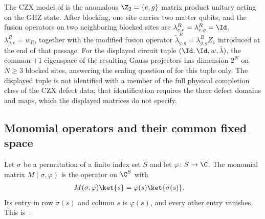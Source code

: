 The CZX model of \cite[lines~4503--5183]{FrancoRubio2025MPUGauging} is the
anomalous $\Z_2=\{e,g\}$ matrix product unitary acting on the GHZ state.
After blocking, one site carries two matter qubits, and the fusion operators on
two neighboring blocked sites are $\lambda^R_{e,e}=\lambda^R_{e,g}=\Id$,
$\lambda^R_{g,e}=w_R$, together with the modified fusion operator
$\tilde\lambda^R_{g,g}=\lambda^R_{g,g}Z_1$ introduced at the end of that
passage.
For the displayed circuit tuple $(\Id,\Id,w,\tilde\lambda)$, the common $+1$
eigenspace of the resulting Gauss projectors has dimension $2^N$ on
$N\geq3$ blocked sites, answering the scaling question of
\cite[lines~5198--5204]{FrancoRubio2025MPUGauging} for this tuple only. The
displayed tuple is not identified with a member of the full physical
completion class of the CZX defect data; that identification requires the
three defect domains and maps, which the displayed matrices do not specify.

\subsection{Monomial operators and their common fixed space}

\begin{definition}
    \label{def:mpug_monomial_matrix}
    \leanok
    Let $\sigma$ be a permutation of a finite index set $S$ and let
    $\varphi\colon S\to\C$. The monomial matrix $M(\sigma,\varphi)$ is the
    operator on $\C^S$ with
    \begin{align}
        M(\sigma,\varphi)\ket{s} & =\varphi(s)\ket{\sigma(s)}.
        \label{eq:mpug_monomial_matrix}
    \end{align}
    Its entry in row $\sigma(s)$ and column $s$ is $\varphi(s)$, and every
    other entry vanishes.
    This is~\cite[``Monomial matrix'']{QICLean2026Blueprint}.
\end{definition}

